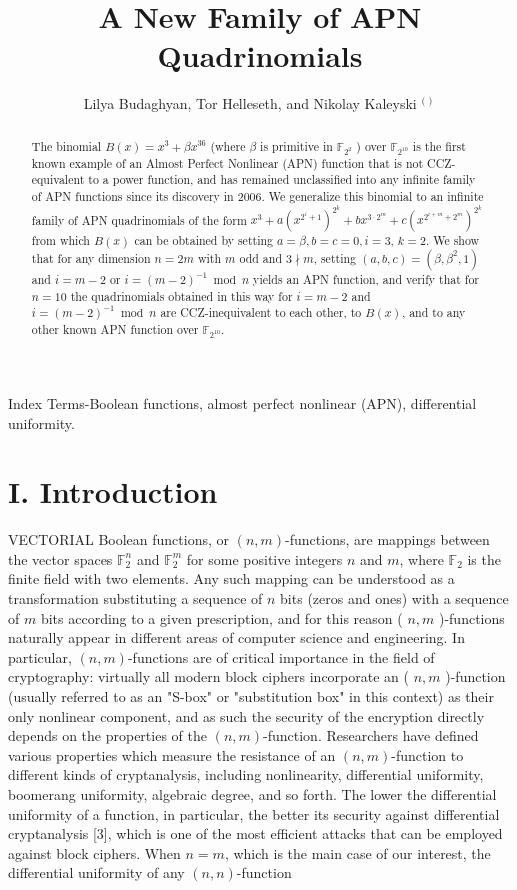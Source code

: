 \documentclass[10pt]{article}
\title{A New Family of APN Quadrinomials }
\author{Lilya Budaghyan, Tor Helleseth, and Nikolay Kaleyski ${ }^{\text {( ) }}$}
\date{}
\begin{document}
\maketitle
\captionsetup{singlelinecheck=false}


\begin{abstract}
The binomial $B(x)=x^{3}+\beta x^{36}$ (where $\beta$ is primitive in $\mathbb{F}_{2^{2}}$ ) over $\mathbb{F}_{2^{10}}$ is the first known example of an Almost Perfect Nonlinear (APN) function that is not CCZ-equivalent to a power function, and has remained unclassified into any infinite family of APN functions since its discovery in 2006. We generalize this binomial to an infinite family of APN quadrinomials of the form $x^{3}+a\left(x^{2^{i}+1}\right)^{2^{k}}+b x^{3 \cdot 2^{m}}+c\left(x^{2^{i+m}+2^{m}}\right)^{2^{k}}$ from which $B(x)$ can be obtained by setting $a=\beta, b=c=0, i=3$, $k=2$. We show that for any dimension $n=2 m$ with $m$ odd and $3 \nmid m$, setting $(a, b, c)=\left(\beta, \beta^{2}, 1\right)$ and $i=m-2$ or $i=(m-2)^{-1} \bmod n$ yields an APN function, and verify that for $n=10$ the quadrinomials obtained in this way for $i=m-2$ and $i=(m-2)^{-1} \bmod n$ are CCZ-inequivalent to each other, to $B(x)$, and to any other known APN function over $\mathbb{F}_{2^{10}}$.
\end{abstract}

Index Terms-Boolean functions, almost perfect nonlinear (APN), differential uniformity.

\section*{I. Introduction}
VECTORIAL Boolean functions, or $(n, m)$-functions, are mappings between the vector spaces $\mathbb{F}_{2}^{n}$ and $\mathbb{F}_{2}^{m}$ for some positive integers $n$ and $m$, where $\mathbb{F}_{2}$ is the finite field with two elements. Any such mapping can be understood as a transformation substituting a sequence of $n$ bits (zeros and ones) with a sequence of $m$ bits according to a given prescription, and for this reason ( $n, m$ )-functions naturally appear in different areas of computer science and engineering. In particular, $(n, m)$-functions are of critical importance in the field of cryptography: virtually all modern block ciphers incorporate an ( $n, m$ )-function (usually referred to as an "S-box" or "substitution box" in this context) as their only nonlinear component, and as such the security of the encryption directly depends on the properties of the $(n, m)$-function. Researchers have defined various properties which measure the resistance of an $(n, m)$-function to different kinds of cryptanalysis, including nonlinearity, differential uniformity, boomerang uniformity, algebraic degree, and so forth. The lower the differential uniformity of a function, in particular, the better its security against differential cryptanalysis [3], which is one of the most efficient attacks that can be employed against block ciphers. When $n=m$, which is the main case of our interest, the differential uniformity of any $(n, n)$-function
\end{document}
